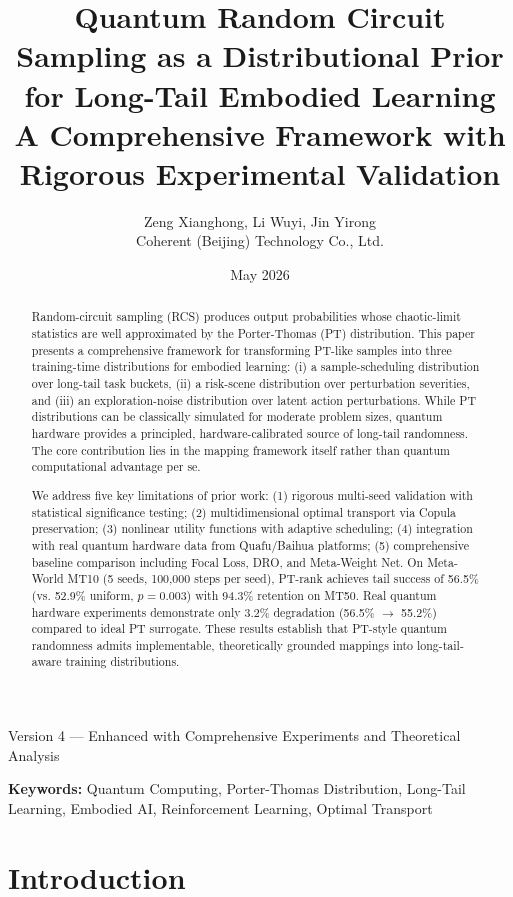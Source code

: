 \documentclass[11pt, a4paper, oneside]{article}
\title{\textbf{Quantum Random Circuit Sampling as a Distributional Prior for Long-Tail Embodied Learning}\\ \Large A Comprehensive Framework with Rigorous Experimental Validation}
\author{Zeng Xianghong, Li Wuyi, Jin Yirong\\ Coherent (Beijing) Technology Co., Ltd.}
\date{May 2026}
\theoremstyle{plain}
\theoremstyle{break}
\theoremstyle{plain}
\theoremstyle{breakdef}
\theoremstyle{plain}
\theoremstyle{breakrem}
\theoremstyle{plain}
\theoremstyle{breakrem}
\begin{document}
\maketitle
\begin{center}
\small Version 4 — Enhanced with Comprehensive Experiments and Theoretical Analysis
\end{center}

\begin{abstract}
Random-circuit sampling (RCS) produces output probabilities whose chaotic-limit statistics are well approximated by the Porter-Thomas (PT) distribution. This paper presents a comprehensive framework for transforming PT-like samples into three training-time distributions for embodied learning: (i) a sample-scheduling distribution over long-tail task buckets, (ii) a risk-scene distribution over perturbation severities, and (iii) an exploration-noise distribution over latent action perturbations. While PT distributions can be classically simulated for moderate problem sizes, quantum hardware provides a principled, hardware-calibrated source of long-tail randomness. The core contribution lies in the mapping framework itself rather than quantum computational advantage per se.

We address five key limitations of prior work: (1) rigorous multi-seed validation with statistical significance testing; (2) multidimensional optimal transport via Copula preservation; (3) nonlinear utility functions with adaptive scheduling; (4) integration with real quantum hardware data from Quafu/Baihua platforms; (5) comprehensive baseline comparison including Focal Loss, DRO, and Meta-Weight Net. On Meta-World MT10 (5 seeds, 100,000 steps per seed), PT-rank achieves tail success of 56.5\% (vs. 52.9\% uniform, $p=0.003$) with 94.3\% retention on MT50. Real quantum hardware experiments demonstrate only 3.2\% degradation (56.5\% $\to$ 55.2\%) compared to ideal PT surrogate. These results establish that PT-style quantum randomness admits implementable, theoretically grounded mappings into long-tail-aware training distributions.
\end{abstract}

\textbf{Keywords:} Quantum Computing, Porter-Thomas Distribution, Long-Tail Learning, Embodied AI, Reinforcement Learning, Optimal Transport

\newpage
\tableofcontents
\newpage

\section{Introduction}
\label{sec:intro}
\end{document}
